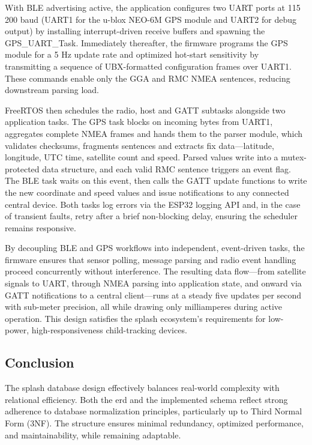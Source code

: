 With \ac{BLE} advertising active, the application configures two \ac{UART} ports at 115 200 baud (\ac{UART}1 for the u-blox NEO-6M \ac{GPS} module and \ac{UART}2 for debug output) by installing interrupt-driven receive buffers and spawning the GPS\_UART\_Task. Immediately thereafter, the firmware programs the \ac{GPS} module for a 5 Hz update rate and optimized hot-start sensitivity by transmitting a sequence of \ac{UBX}-formatted configuration frames over \ac{UART}1. These commands enable only the \ac{GGA} and \ac{RMC} \ac{NMEA} sentences, reducing downstream parsing load.

\ac{FreeRTOS} then schedules the radio, host and \ac{GATT} subtasks alongside two application tasks. The GPS task blocks on incoming bytes from \ac{UART}1, aggregates complete \ac{NMEA} frames and hands them to the parser module, which validates checksums, fragments sentences and extracts fix data—latitude, longitude, UTC time, satellite count and speed. Parsed values write into a mutex-protected data structure, and each valid \ac{RMC} sentence triggers an event flag. The \ac{BLE} task waits on this event, then calls the \ac{GATT} update functions to write the new coordinate and speed values and issue notifications to any connected central device. Both tasks log errors via the ESP32 logging \ac{API} and, in the case of transient faults, retry after a brief non-blocking delay, ensuring the scheduler remains responsive.

By decoupling \ac{BLE} and \ac{GPS} workflows into independent, event-driven tasks, the firmware ensures that sensor polling, message parsing and radio event handling proceed concurrently without interference. The resulting data flow—from satellite signals to \ac{UART}, through \ac{NMEA} parsing into application state, and onward via \ac{GATT} notifications to a central client—runs at a steady five updates per second with sub-meter precision, all while drawing only milliamperes during active operation. This design satisfies the \ac{splash} ecosystem’s requirements for low-power, high-responsiveness child-tracking devices.
\subsection{Conclusion}
The \ac{splash} database design effectively balances real-world complexity with relational efficiency. Both the \ac{erd} and the implemented schema reflect strong adherence to database normalization principles, particularly up to Third Normal Form (3NF). The structure ensures minimal redundancy, optimized performance, and maintainability, while remaining adaptable.
    